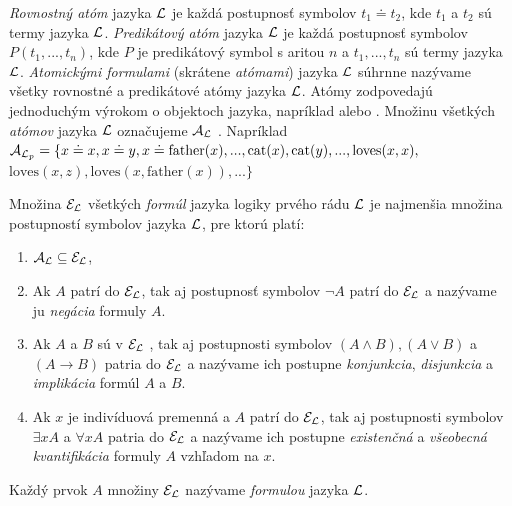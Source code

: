 \emph{Rovnostný atóm} jazyka $\mathcal{L}$ je každá postupnosť symbolov $t_1 \doteq t_2$, kde $t_1$ a $t_2$ sú termy jazyka $\mathcal{L}$.
\emph{Predikátový atóm} jazyka $\mathcal{L}$ je každá postupnosť symbolov $P(t_1, ..., t_n)$, kde $P$ je predikátový symbol s aritou $n$ a $t_1, ..., t_n$ sú termy jazyka $\mathcal{L}$.
\emph{Atomickými formulami} (skrátene \emph{atómami}) jazyka $\mathcal{L}$ súhrnne nazývame všetky rovnostné a predikátové atómy jazyka $\mathcal{L}$.
Atómy zodpovedajú jednoduchým výrokom o objektoch jazyka, napríklad  alebo .
Množinu všetkých \emph{atómov} jazyka $\mathcal{L}$ označujeme $\mathcal{A}_{\mathcal{L}}$ .
Napríklad $\mathcal{A}_{\mathcal{L}_p} = \{x \doteq x, x \doteq y, x \doteq \text{father}(x), ... , \text{cat}(x), \text{cat}(y), ... , \text{loves}(x, x),$\\$\text{loves}(x, z), \text{loves}(x, \text{father}(x)), ... \}$

Množina $\mathcal{E}_{\mathcal{L}}$ všetkých \emph{formúl} jazyka logiky prvého rádu $\mathcal{L}$ je najmenšia množina postupností symbolov jazyka $\mathcal{L}$, pre ktorú platí:
\begin{enumerate}
\item $\mathcal{A}_{\mathcal{L}} \subseteq \mathcal{E}_{\mathcal{L}}$, 
\item Ak $A$ patrí do $\mathcal{E}_{\mathcal{L}}$, tak aj postupnosť symbolov $\neg A$ patrí do $\mathcal{E}_{\mathcal{L}}$ a nazývame ju \emph{negácia} formuly $A$.
\item Ak $A$ a $B$ sú v $\mathcal{E}_{\mathcal{L}}$ , tak aj postupnosti symbolov $(A \land B), (A \lor B)$ a $(A \to B)$ patria do $\mathcal{E}_{\mathcal{L}}$ a nazývame ich postupne \emph{konjunkcia}, \emph{disjunkcia} a \emph{implikácia} formúl $A$ a $B$.
\item Ak $x$ je indivíduová premenná a $A$ patrí do $\mathcal{E}_{\mathcal{L}}$, tak aj postupnosti symbolov $\exists x A$ a $\forall x A$ patria do $\mathcal{E}_{\mathcal{L}}$ a nazývame ich postupne \emph{existenčná} a \emph{všeobecná kvantifikácia} formuly $A$ vzhľadom na $x$.
\end{enumerate}
Každý prvok $A$ množiny $\mathcal{E}_{\mathcal{L}}$ nazývame \emph{formulou} jazyka $\mathcal{L}$.

